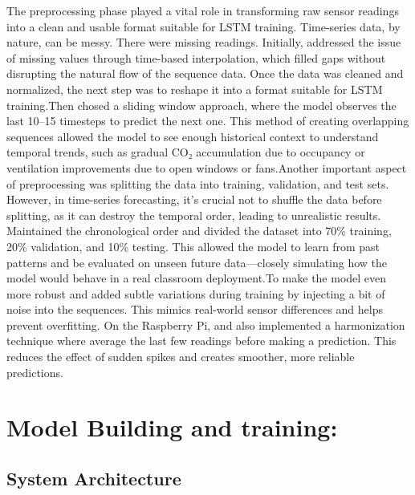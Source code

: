  The preprocessing phase played a vital role in transforming raw sensor readings into a clean and usable format suitable for LSTM training. Time-series data, by nature, can be messy. There were missing readings. Initially, addressed the issue of missing values through time-based interpolation, which filled gaps without disrupting the natural flow of the sequence data. Once the data was cleaned and normalized, the next step was to reshape it into a format suitable for LSTM training.Then chosed a sliding window approach, where the model observes the last 10–15 timesteps to predict the next one. This method of creating overlapping sequences allowed the model to see enough historical context to understand temporal trends, such as gradual CO₂ accumulation due to occupancy or ventilation improvements due to open windows or fans.Another important aspect of preprocessing was splitting the data into training, validation, and test sets.
 However, in time-series forecasting, it’s crucial not to shuffle the data before splitting, as it can destroy the temporal order, leading to unrealistic results. Maintained the chronological order and divided the dataset into 70\% training, 20\% validation, and 10\% testing. This allowed the model to learn from past patterns and be evaluated on unseen future data—closely simulating how the model would behave in a real classroom deployment.To make the model even more robust and added subtle variations during training by injecting a bit of noise into the sequences. This mimics real-world sensor differences and helps prevent overfitting. On the Raspberry Pi, and also implemented a harmonization technique where average the last few readings before making a prediction. This reduces the effect of sudden spikes and creates smoother, more reliable predictions.
\section{Model Building and training:}
\subsection{System Architecture}


